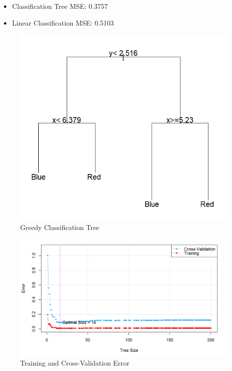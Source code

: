 \documentclass[12pt]{article}
\begin{document}
\begin{itemize}
    \item Classification Tree MSE: 0.3757
    \item Linear Classification MSE: 0.5103
\end{itemize}



\begin{figure}
    \centering
    \includegraphics[scale=0.50]{Greedy Classification Tree.png}
    \caption{Greedy Classification Tree}
    \label{fig:sub3}  %
\end{figure}%





\begin{figure}
    \centering
    \includegraphics[scale=0.50]{Pruning.png}
    \caption{Training and Cross-Validation Error}
    \label{fig:sub4}  %
\end{figure}
\end{document}
